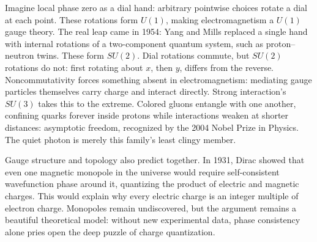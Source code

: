 \begin{challenge}
Imagine local phase zero as a dial hand: arbitrary pointwise choices rotate a dial at each point. These rotations form \(U(1)\), making electromagnetism a \(U(1)\) gauge theory. The real leap came in 1954: Yang and Mills replaced a single hand with internal rotations of a two-component quantum system, such as proton--neutron twins. These form \(SU(2)\). Dial rotations commute, but \(SU(2)\) rotations do not: first rotating about \(x\), then \(y\), differs from the reverse. Noncommutativity forces something absent in electromagnetism: mediating gauge particles themselves carry charge and interact directly. Strong interaction's \(SU(3)\) takes this to the extreme. Colored gluons entangle with one another, confining quarks forever inside protons while interactions weaken at shorter distances: asymptotic freedom, recognized by the 2004 Nobel Prize in Physics. The quiet photon is merely this family's least clingy member.

Gauge structure and topology also predict together. In 1931, Dirac showed that even one magnetic monopole in the universe would require self-consistent wavefunction phase around it, quantizing the product of electric and magnetic charges. This would explain why every electric charge is an integer multiple of electron charge. Monopoles remain undiscovered, but the argument remains a beautiful theoretical model: without new experimental data, phase consistency alone pries open the deep puzzle of charge quantization.
\end{challenge}


